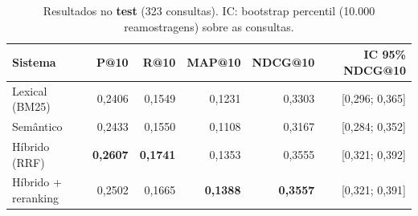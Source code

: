 \begin{table}[t]
\centering
\caption{Resultados no \textbf{test} (323 consultas). IC: bootstrap percentil (10.000 reamostragens) sobre as consultas.}
\label{tab:test_main}
\small
\begin{tabular}{lrrrrr}
\toprule
Sistema & P@10 & R@10 & MAP@10 & NDCG@10 & IC 95\% NDCG@10 \\
\midrule
Lexical (BM25) & 0,2406 & 0,1549 & 0,1231 & 0,3303 & [0,296; 0,365] \\
Semântico & 0,2433 & 0,1550 & 0,1108 & 0,3167 & [0,284; 0,352] \\
Híbrido (RRF) & \textbf{0,2607} & \textbf{0,1741} & 0,1353 & 0,3555 & [0,321; 0,392] \\
Híbrido + reranking & 0,2502 & 0,1665 & \textbf{0,1388} & \textbf{0,3557} & [0,321; 0,391] \\
\bottomrule
\end{tabular}
\end{table}
